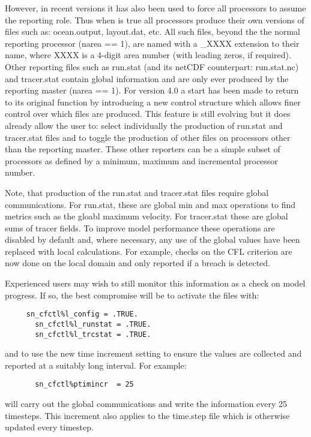 \documentclass[../main/NEMO_manual]{subfiles}
\begin{document}
However, in recent versions it has also been used to force all processors to assume the
reporting role. Thus when  is true all processors produce their own versions
of files such as: ocean.output, layout.dat, etc.  All such files, beyond the the normal
reporting processor (narea == 1), are named with a \_XXXX extension to their name, where
XXXX is a 4-digit area number (with leading zeros, if required). Other reporting files
such as run.stat (and its netCDF counterpart: run.stat.nc) and tracer.stat contain global
information and are only ever produced by the reporting master (narea == 1). For version
4.0 a start has been made to return  to its original function by introducing
a new control structure which allows finer control over which files are produced. This
feature is still evolving but it does already allow the user to: select individually the
production of run.stat and tracer.stat files and to toggle the production of other files
on processors other than the reporting master. These other reporters can be a simple
subset of processors as defined by a minimum, maximum and incremental processor number.

Note, that production of the run.stat and tracer.stat files require global communications.
For run.stat, these are global min and max operations to find metrics such as the gloabl
maximum velocity. For tracer.stat these are global sums of tracer fields. To improve model
performance these operations are disabled by default and, where necessary, any use of the
global values have been replaced with local calculations. For example, checks on the CFL
criterion are now done on the local domain and only reported if a breach is detected.

Experienced users may wish to still monitor this information as a check on model progress.
If so, the best compromise will be to activate the files with:

\begin{verbatim}
     sn_cfctl%l_config = .TRUE.
       sn_cfctl%l_runstat = .TRUE.
       sn_cfctl%l_trcstat = .TRUE.
\end{verbatim}

and to use the new time increment setting to ensure the values are collected and reported
at a suitably long interval. For example:

\begin{verbatim}     
       sn_cfctl%ptimincr  = 25
\end{verbatim}

will carry out the global communications and write the information every 25 timesteps. This 
increment also applies to the time.step file which is otherwise updated every timestep.

\biblio

\pindex
\end{document}
